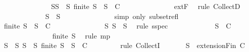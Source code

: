 \begin{isabellebody}
\ \ \ \ \ \ \ \ \ \ \ \isamarkupfalse%
\ \isamarkupfalse%
\ S{\isacharprime}{\isacharcolon}{\isachardoublequoteopen}{\isasymforall}S{\isacharprime}{\isacharprime}\ {\isasymsubseteq}\ S{\isacharprime}{\isachardot}\ finite\ S{\isacharprime}{\isacharprime}\ {\isasymlongrightarrow}\ S{\isacharprime}{\isacharprime}\ {\isasymin}\ C{\isachardoublequoteclose}\isanewline
\ \ \ \ \ \ \ \ \ \ \ \ \ \isamarkupfalse%
\ extF\ \isamarkupfalse%
\ {\isacharparenleft}rule\ CollectD{\isacharparenright}\isanewline
\ \ \ \ \ \ \ \ \ \ \ \isamarkupfalse%
\ {\isachardoublequoteopen}S{\isacharprime}\ {\isasymsubseteq}\ S{\isacharprime}{\isachardoublequoteclose}\isanewline
\ \ \ \ \ \ \ \ \ \ \ \ \ \isamarkupfalse%
\ {\isacharparenleft}simp\ only{\isacharcolon}\ subset{\isacharunderscore}refl{\isacharparenright}\isanewline
\ \ \ \ \ \ \ \ \ \ \ \isamarkupfalse%
\ {\isachardoublequoteopen}finite\ S{\isacharprime}\ {\isasymlongrightarrow}\ S{\isacharprime}\ {\isasymin}\ C{\isachardoublequoteclose}\isanewline
\ \ \ \ \ \ \ \ \ \ \ \ \ \isamarkupfalse%
\ S{\isacharprime}\ {\isacartoucheopen}S{\isacharprime}\ {\isasymsubseteq}\ S{\isacharprime}{\isacartoucheclose}\ \isamarkupfalse%
\ {\isacharparenleft}rule\ sspec{\isacharparenright}\isanewline
\ \ \ \ \ \ \ \ \ \ \ \isamarkupfalse%
\ {\isachardoublequoteopen}S{\isacharprime}\ {\isasymin}\ C{\isachardoublequoteclose}\isanewline
\ \ \ \ \ \ \ \ \ \ \ \ \ \isamarkupfalse%
\ {\isacartoucheopen}finite\ S{\isacharprime}{\isacartoucheclose}\ \isamarkupfalse%
\ {\isacharparenleft}rule\ mp{\isacharparenright}\isanewline
\ \ \ \ \ \ \ \ \ \isamarkupfalse%
\isanewline
\ \ \ \ \ \ \ \isamarkupfalse%
\isanewline
\ \ \ \ \ \isamarkupfalse%
\isanewline
\ \ \ \ \ \isamarkupfalse%
\ \isamarkupfalse%
\ {\isachardoublequoteopen}S\ {\isasymin}\ {\isacharbraceleft}S{\isachardot}\ {\isasymforall}S{\isacharprime}\ {\isasymsubseteq}\ S{\isachardot}\ finite\ S{\isacharprime}\ {\isasymlongrightarrow}\ S{\isacharprime}\ {\isasymin}\ C{\isacharbraceright}{\isachardoublequoteclose}\isanewline
\ \ \ \ \ \ \ \isamarkupfalse%
\ {\isacharparenleft}rule\ CollectI{\isacharparenright}\isanewline
\ \ \ \ \ \isamarkupfalse%
\ {\isachardoublequoteopen}S\ {\isasymin}\ {\isacharparenleft}extensionFin\ C{\isacharparenright}{\isachardoublequoteclose}\isanewline
\ \ \ \ \ \ \ \isamarkupfalse%

\end{isabellebody}
